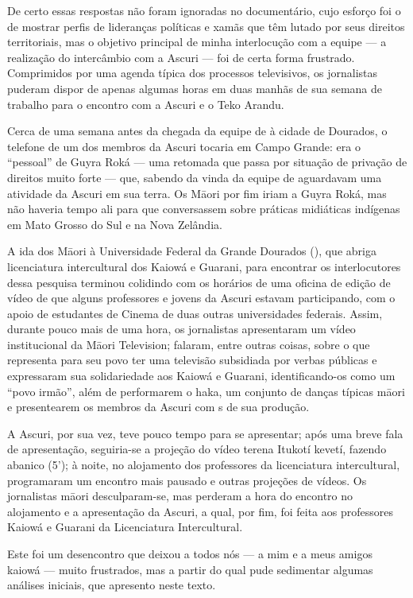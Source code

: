 {{De certo essas respostas não foram ignoradas no documentário, cujo
esforço foi o de mostrar perfis de lideranças políticas e xamãs que têm
lutado por seus direitos territoriais, mas o objetivo principal de
minha interlocução com a equipe --- a realização do intercâmbio com a
Ascuri --- foi de certa forma frustrado. Comprimidos por uma agenda
típica dos processos televisivos, os jornalistas puderam dispor de
apenas algumas horas em duas manhãs de sua semana de trabalho para o
encontro com a Ascuri e o Teko Arandu.

Cerca de uma semana antes da chegada da equipe de  à cidade de
Dourados, o telefone de um dos membros da Ascuri tocaria em Campo
Grande: era o ``pessoal'' de Guyra Roká --- uma retomada que passa por
situação de privação de direitos muito forte --- que, sabendo da vinda da
equipe de  aguardavam uma atividade da Ascuri em sua terra. Os
M\=aori por fim iriam a Guyra Roká, mas não haveria tempo ali para que
conversassem sobre práticas midiáticas indígenas em Mato Grosso do Sul
e na Nova Zelândia. 

A ida dos M\=aori à Universidade Federal da Grande Dourados (), que
abriga licenciatura intercultural dos Kaiowá e Guarani, para encontrar
os interlocutores dessa pesquisa terminou colidindo com os horários de
uma oficina de edição de vídeo de que alguns professores e jovens da
Ascuri estavam participando, com o apoio de estudantes de Cinema de
duas outras universidades federais. Assim, durante pouco mais de uma
hora, os jornalistas apresentaram um vídeo institucional da M\=aori
Television; falaram, entre outras coisas, sobre o que representa para
seu povo ter uma televisão subsidiada por verbas públicas e expressaram
sua solidariedade aos Kaiowá e Guarani, identificando-os como um ``povo
irmão'', além de performarem o haka, um conjunto de danças típicas
m\=aori e presentearem os membros da Ascuri com s de sua produção. 

A Ascuri, por sua vez, teve pouco tempo para se apresentar; após uma
breve fala de apresentação, seguiria-se a projeção do vídeo terena
Itukotí kevetí, fazendo abanico (5’); à noite, no alojamento dos
professores da licenciatura intercultural, programaram um encontro mais
pausado e outras projeções de vídeos. Os jornalistas m\=aori
desculparam-se, mas perderam a hora do encontro no alojamento e a
apresentação da Ascuri, a qual, por fim, foi feita aos professores
Kaiowá e Guarani da Licenciatura Intercultural. 

Este foi um desencontro que deixou a todos nós --- a mim e a meus amigos
kaiowá --- muito frustrados, mas a partir do qual pude sedimentar algumas
análises iniciais, que apresento neste texto. 

}}
